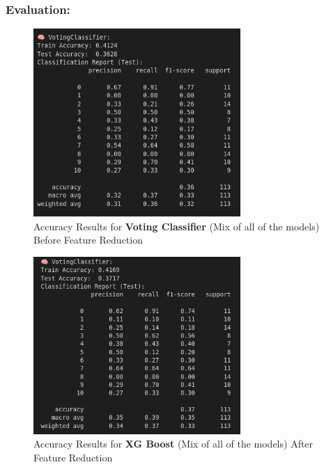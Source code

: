 \documentclass[a4paper,12pt]{article}
\begin{document}
\subsubsection{Evaluation:}
\begin{figure}[H]
    \centering
    \includegraphics[width=0.7\textwidth]{./images/votacc1.png}
    \caption{Accuracy Results for \textbf{Voting Classifier} (Mix of all of the models) Before Feature Reduction}
    \label{fig:fig_31}
\end{figure}
\begin{figure}[H]
    \centering
    \includegraphics[width=0.7\textwidth]{./images/votacc2.png}
    \caption{Accuracy Results for \textbf{XG Boost} (Mix of all of the models) After Feature Reduction}
    \label{fig:fig_32}
\end{figure}

\end{document}
